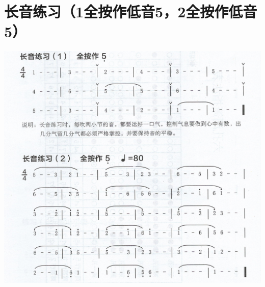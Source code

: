 \documentclass[cn,pad,chinese,chinesefont=nofont]{elegantbook}
\begin{document}
\section{长音练习（1全按作低音5，2全按作低音5）}
\includegraphics[width=\textwidth]{dongxiao/Scan 7.jpeg}
\end{document}
